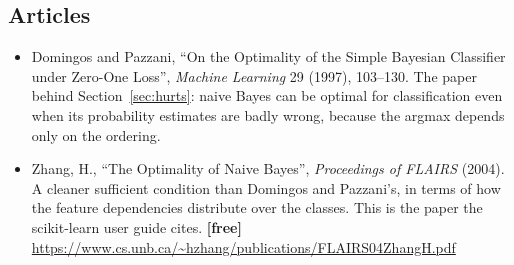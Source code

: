 \documentclass[11pt]{article}
\begin{document}
\subsection*{Articles}

\begin{itemize}[leftmargin=*]
  \item Domingos and Pazzani, ``On the Optimality of the Simple Bayesian
    Classifier under Zero-One Loss'', \emph{Machine Learning} 29 (1997),
    103--130. The paper behind Section~\ref{sec:hurts}: naive Bayes can be
    optimal for classification even when its probability estimates are
    badly wrong, because the argmax depends only on the ordering.
  \item Zhang, H., ``The Optimality of Naive Bayes'', \emph{Proceedings of
    FLAIRS} (2004). A cleaner sufficient condition than Domingos and
    Pazzani's, in terms of how the feature dependencies distribute over the
    classes. This is the paper the scikit-learn user guide cites.
    \textbf{[free]}
    \url{https://www.cs.unb.ca/~hzhang/publications/FLAIRS04ZhangH.pdf}
\end{itemize}

\enlargethispage{4\baselineskip}
\notesources{\AMLUnitVISources}
\end{document}
